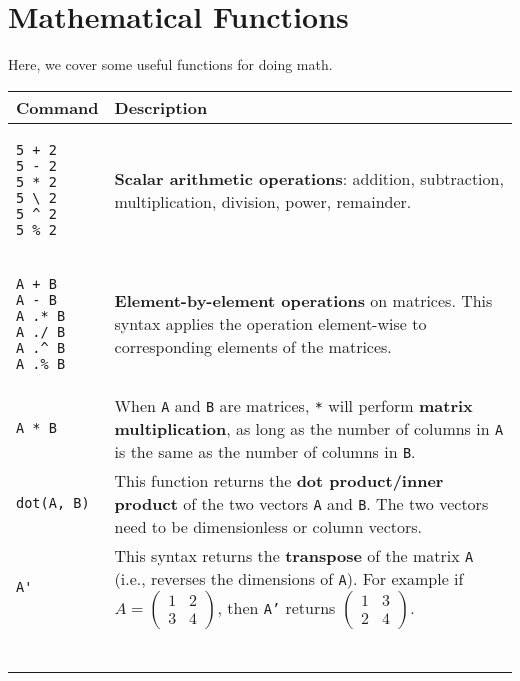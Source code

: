 \documentclass[]{article}
\begin{document}
\section{Mathematical Functions}
Here, we cover some useful functions for doing math.
\begin{longtable}{ |m{6cm}  | m{11cm} |}
	\hline
	\textbf{Command} & \textbf{Description}
	\\\hline
	\begin{verbatim}
5 + 2
5 - 2
5 * 2 
5 \ 2
5 ^ 2
5 % 2
	\end{verbatim}
	& \textbf{Scalar arithmetic operations}: addition, subtraction, multiplication, division, power, remainder.
	\\\hline
	\begin{verbatim}
A + B
A - B
A .* B
A ./ B
A .^ B
A .% B
	\end{verbatim}
    & \textbf{Element-by-element operations} on matrices. This syntax applies
    the operation element-wise to corresponding elements of the matrices.
    \\\hline
	\begin{verbatim}
A * B
	\end{verbatim}
	& When \texttt{A} and \texttt{B} are matrices, \texttt{*} will perform
    \textbf{matrix multiplication}, as long as the number of columns in \texttt{A} is the same as the number of columns in \texttt{B}. 
	\\\hline
	\begin{verbatim}
dot(A, B)
	\end{verbatim}
	& This function returns the \textbf{dot product/inner product} of the two vectors
    \texttt{A} and \texttt{B}. The two vectors need to be dimensionless or
    column vectors.	\\\hline
    \begin{verbatim}
A'
	\end{verbatim}
	& This syntax returns the \textbf{transpose} of the matrix
    \texttt{A} (i.e., reverses the dimensions of \texttt{A}). For example if
    $A = \begin{pmatrix}
    1 & 2 \\
    3 & 4 
    \end{pmatrix}$, then \texttt{A'} returns 
    $\begin{pmatrix}
    1 & 3 \\
    2 & 4
    \end{pmatrix}$. \\\hline
\begin{verbatim}

\end{verbatim}
\end{longtable}
\end{document}
